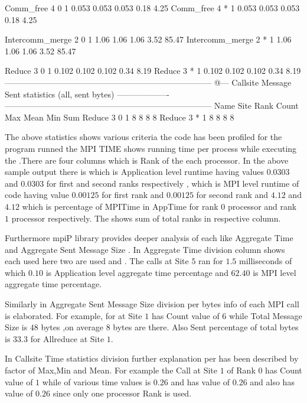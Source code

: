 \begin{Output}
Comm_free            4    0      1    0.053    0.053    0.053   0.18   4.25
Comm_free            4    *      1    0.053    0.053    0.053   0.18   4.25

Intercomm_merge      2    0      1     1.06     1.06     1.06   3.52  85.47
Intercomm_merge      2    *      1     1.06     1.06     1.06   3.52  85.47

Reduce               3    0      1    0.102    0.102    0.102   0.34   8.19
Reduce               3    *      1    0.102    0.102    0.102   0.34   8.19
---------------------------------------------------------------------------
  @--- Callsite Message Sent statistics (all, sent bytes) -------------------
  ---------------------------------------------------------------------------
  Name              Site Rank   Count       Max      Mean       Min       Sum
Reduce               3    0       1         8         8         8         8
Reduce               3    *       1         8         8         8         8
\end{Output}

The above statistics shows various criteria the code has been profiled for the program 
runned the MPI TIME shows running time per process while executing the .There are four
columns  which is Rank of the each processor. In the above sample output there is which
is Application level runtime having values $0.0303$ and $0.0303$ for first and second ranks respectively
, which is MPI level runtime of code having value $0.00125$ for first rank
and $0.00125$ for second rank and $4.12$   and $4.12$ which is percentage of MPITime in AppTime for rank $0$ processor and rank $1$ processor respectively.
The \code{*} shows sum of total ranks in respective column.

Furthermore mpiP library provides deeper analysis of each  like Aggregate Time and 
Aggregate Sent Message Size . In Aggregate Time division  column shows each  used
here two are used  and . The  calls at Site $5$ ran for $1.5$ milliseconds 
of which $0.10$ is Application level aggregate time percentage and $62.40$ is MPI level aggregate time percentage.

Similarly in Aggregate Sent Message Size division per bytes info of each MPI call is elaborated.
For example, for  at Site $1$ has Count value of $6$ while Total Message Size is $48$ bytes ,on average $8$ bytes are there.
Also Sent percentage of total bytes is $33.3$ for Allreduce at Site $1$.

In Callsite Time statistics division further explanation per  has been described by factor of Max,Min and Mean.
For example the  Call at Site $1$ of Rank $0$ has Count value of $1$ while  of various time values is $0.26$ and  has value of $0.26$ and  also has value of $0.26$ since only one processor Rank  is used.


